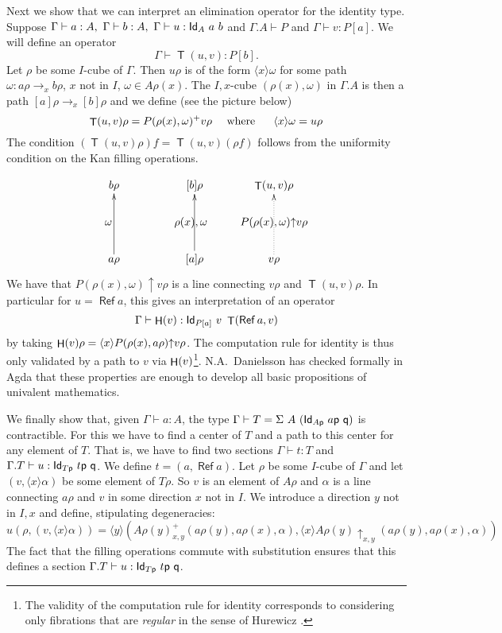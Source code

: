 \documentclass[10pt,a4paper]{article}
\DeclareMathOperator{\Ref}{\mathsf{Ref}}
\DeclareMathOperator{\Transp}{\mathsf{T}}
\DeclareMathOperator{\HH}{{\sf H}}
\newcommand{\Id}{{\sf Id}}
\newcommand{\pp}{{\sf p}}
\newcommand{\qq}{{\sf q}}
\newcommand{\rup}[1]{#1{\uparrow}}
\newcommand{\rupxy}[1]{#1{\uparrow_{x,y}}}
\newcommand{\bind}[2]{{\langle}#1{\rangle}#2}
\begin{document}
Next we show that we can interpret an elimination operator for the
identity type.  Suppose $\Gamma\vdash a:A,~\Gamma\vdash
b:A,~\Gamma\vdash u:\Id_A~a~b$ and $\Gamma.A\vdash P$ and
$\Gamma\vdash v:P[a]$. We will define an operator
$$
\Gamma\vdash \Transp(u,v):P[b].
$$
Let $\rho$ be some $I$-cube of $\Gamma$. Then $u\rho$ is of the form
$\bind{x}{\omega}$ for some path $\omega:a\rho\to _x b\rho$, $x$ not
in $I$, $\omega\in A\rho(x)$.  The $I,x$-cube $(\rho (x),\omega)$ in
$\Gamma.A$ is then a path $[a]\rho\to _x [b]\rho$ and we define (see
the picture below)
$$
\Transp(u,v)\rho = P(\rho (x),\omega)^+ v\rho~~~~{\rm
  where~~~~~}\bind{x}{\omega} = u\rho
$$
The condition $(\Transp(u,v)\rho)f = \Transp(u,v)(\rho f)$ follows
from the uniformity condition on the Kan filling operations.

\[
\xymatrix@R=.6cm@C=.6cm{
b\rho                 &&[b]\rho                    &   \Transp(u,v)\rho                                 \\
\omega ~~~     &&\rho(x),\omega~~  &\rup{P(\rho(x),\omega)} v\rho \\
a\rho\ar[uu]      &&[a]\rho\ar[uu]       &   v\rho\ar@{.>}[uu]                        \\
}
\]
We have that $\rup{P(\rho(x),\omega)} v\rho$ is a line connecting
$v\rho$ and $\Transp(u,v)\rho$.  In particular for $u=\Ref a$, this gives
an interpretation of an operator
$$
\Gamma\vdash \HH(v):\Id_{P[a]}~v~\Transp(\Ref a,v)
$$
by taking $\HH(v)\rho = \bind{x}{\rup{P(\rho (x),a\rho)} v\rho}$.  The
computation rule for identity is thus only validated by a path to $v$
via $\HH(v)$\footnote{The validity of the computation rule for
  identity corresponds to considering only fibrations that are {\em
    regular} in the sense of Hurewicz \cite{hurewicz}.}.
N.A.~Danielsson has checked formally in Agda that these properties are
enough to develop all basic propositions of univalent mathematics.


We finally show that, given $\Gamma\vdash a:A$, the type $\Gamma
\vdash T = \Sigma~A~(\Id_{A\pp}~a\pp~\qq)$ is contractible. For this
we have to find a center of $T$ and a path to this center for any
element of $T$.  That is, we have to find two sections $\Gamma\vdash
t:T$ and $\Gamma.T\vdash u:\Id_{T\pp}~t\pp~\qq$.  We define $t =
(a,\Ref a)$. Let $\rho$ be some $I$-cube of $\Gamma$ and let
$(v,\bind{x}{\alpha})$ be some element of $T\rho$. So $v$ is an
element of $A\rho$ and $\alpha$ is a line connecting $a\rho$ and $v$
in some direction $x$ not in $I$. We introduce a direction $y$ not in
$I,x$ and define, stipulating degeneracies:
$$
u(\rho,(v,\bind{x}{\alpha})) = \bind{y}{(A\rho(y)^+ _{x,y}
  (a\rho(y),a\rho(x),\alpha),\bind{x}{\rupxy{A\rho(y)}
    (a\rho(y),a\rho(x),\alpha)})}
$$
The fact that the filling operations commute with substitution ensures
that this defines a section $\Gamma.T\vdash u:\Id_{T\pp}~t\pp~\qq$.
\end{document}
